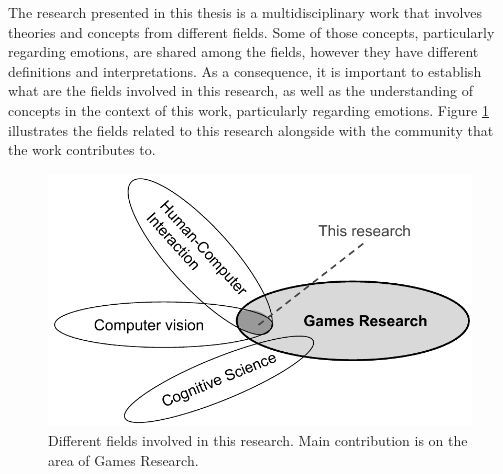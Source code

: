 The research presented in this thesis is a multidisciplinary work that involves theories and concepts from different fields. Some of those concepts, particularly regarding emotions, are shared among the fields, however they have different definitions and interpretations. As a consequence, it is important to establish what are the fields involved in this research, as well as the understanding of concepts in the context of this work, particularly regarding emotions. Figure \ref{fig:fields} illustrates the fields related to this research alongside with the community that the work contributes to.

\begin{figure}[h]
    \centering
    \includegraphics[scale=0.6]{Content/figures/fields}
    \caption{Different fields involved in this research. Main contribution is on the area of Games Research.}
    \label{fig:fields}
\end{figure}

